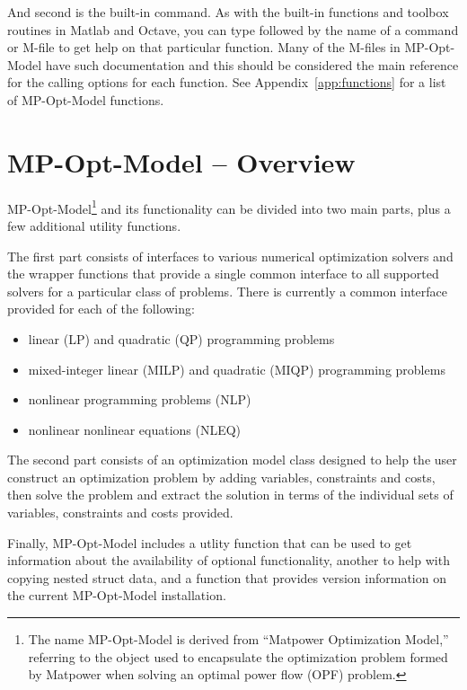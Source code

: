 \documentclass[12pt]{article}
\newcommand{\matlab}[0]{{\sc Matlab}}
\newcommand{\matpower}[0]{{\sc Matpower}}
\newcommand{\mpom}[0]{\mbox{MP-Opt-Model}}
\newcommand{\code}[1]{{\relsize{-0.5}{\tt{{#1}}}}}  %
\numberwithin{equation}{section}
\numberwithin{table}{section}
\numberwithin{figure}{section}
\begin{document}
And second is the built-in \code{help} command. As with the built-in functions and toolbox routines in \matlab{} and Octave, you can type \code{help} followed by the name of a command or M-file to get help on that particular function. Many of the M-files in \mpom{} have such documentation and this should be considered the main reference for the calling options for each function. See Appendix~\ref{app:functions} for a list of \mpom{} functions.

\clearpage
\section{\mpom{} -- Overview}
\label{sec:mpom}

\mpom{}\footnote{The name \mpom{} is derived from ``\matpower{} Optimization Model,'' referring to the object used to encapsulate the optimization problem formed by \matpower{} when solving an optimal power flow (OPF) problem.} and its functionality can be divided into two main parts, plus a few additional utility functions.

The first part consists of interfaces to various numerical optimization solvers and the wrapper functions that provide a single common interface to all supported solvers for a particular class of problems. There is currently a common interface provided for each of the following:
\begin{itemize}
\item linear (LP) and quadratic (QP) programming problems
\item mixed-integer linear (MILP) and quadratic (MIQP) programming problems
\item nonlinear programming problems (NLP)
\item nonlinear nonlinear equations (NLEQ)
\end{itemize}

The second part consists of an optimization model class designed to help the user construct an optimization problem by adding variables, constraints and costs, then solve the problem and extract the solution in terms of the individual sets of variables, constraints and costs provided.

Finally, \mpom{} includes a utlity function that can be used to get information about the availability of optional functionality, another to help with copying nested struct data, and a function that provides version information on the current \mpom{} installation.
\end{document}
